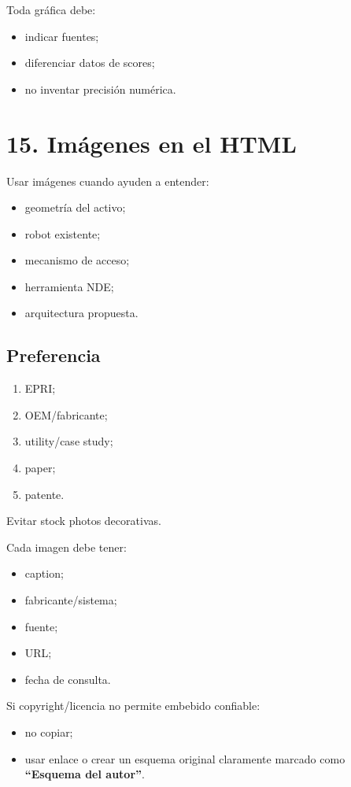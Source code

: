 \documentclass[11pt,a4paper]{article}
\begin{document}
Toda gráfica debe:

\begin{itemize}
\item indicar fuentes;
\item diferenciar datos de scores;
\item no inventar precisión numérica.
\end{itemize}


\section*{15. Imágenes en el HTML}
Usar imágenes cuando ayuden a entender:

\begin{itemize}
\item geometría del activo;
\item robot existente;
\item mecanismo de acceso;
\item herramienta NDE;
\item arquitectura propuesta.
\end{itemize}


\subsection*{Preferencia}
\begin{enumerate}
\item EPRI;
\item OEM/fabricante;
\item utility/case study;
\item paper;
\item patente.
\end{enumerate}

Evitar stock photos decorativas.

Cada imagen debe tener:

\begin{itemize}
\item caption;
\item fabricante/sistema;
\item fuente;
\item URL;
\item fecha de consulta.
\end{itemize}

Si copyright/licencia no permite embebido confiable:

\begin{itemize}
\item no copiar;
\item usar enlace o crear un esquema original claramente marcado como \textbf{``Esquema del autor''}.
\end{itemize}
\end{document}
